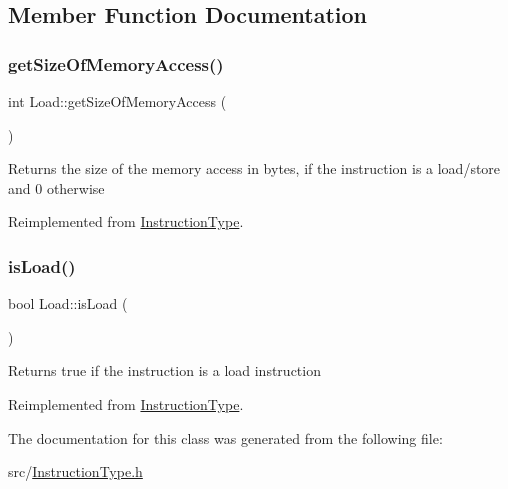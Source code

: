 \subsection{Member Function Documentation}
\mbox{\label{classLoad_a35d504d74dfa9ea02ae719f41dd766a8}} 
\subsubsection{\texorpdfstring{get\+Size\+Of\+Memory\+Access()}{getSizeOfMemoryAccess()}}
{\footnotesize\ttfamily int Load\+::get\+Size\+Of\+Memory\+Access (\begin{DoxyParamCaption}{ }\end{DoxyParamCaption})\hspace{0.3cm}{\ttfamily [virtual]}}

Returns the size of the memory access in bytes, if the instruction is a load/store and 0 otherwise 

Reimplemented from \hyperlink{classInstructionType_a40c94ccf0b13f186524e06972f08bca3}{Instruction\+Type}.

\mbox{\label{classLoad_aa7fbffafad6cbfa1b9866f6d09cc7e30}} 
\subsubsection{\texorpdfstring{is\+Load()}{isLoad()}}
{\footnotesize\ttfamily bool Load\+::is\+Load (\begin{DoxyParamCaption}{ }\end{DoxyParamCaption})\hspace{0.3cm}{\ttfamily [virtual]}}

Returns true if the instruction is a load instruction 

Reimplemented from \hyperlink{classInstructionType_aa3d2c042a4109b1d96dc0d7f20916ba3}{Instruction\+Type}.



The documentation for this class was generated from the following file\+:\begin{DoxyCompactItemize}
\item 
src/\hyperlink{InstructionType_8h}{Instruction\+Type.\+h}\end{DoxyCompactItemize}
